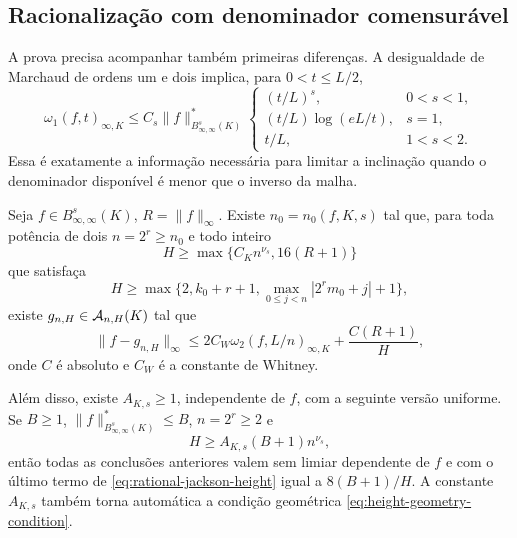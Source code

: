 \subsection{Racionalização com denominador comensurável}

A prova precisa acompanhar também primeiras diferenças. A desigualdade de
Marchaud de ordens um e dois
\citep{devorelorentz1993,lorentz1996} implica, para $0<t\le L/2$,
\begin{equation}
 \omega_1(f,t)_{\infty,K}
 \le C_s\|f\|_{B^s_{\infty,\infty}(K)}^*
 \begin{cases}
  (t/L)^s,&0<s<1,\\
  (t/L)\log(eL/t),&s=1,\\
  t/L,&1<s<2.
 \end{cases}
 \label{eq:marchaud-regimes}
\end{equation}
Essa é exatamente a informação necessária para limitar a inclinação quando
o denominador disponível é menor que o inverso da malha.

\begin{lemma}
\label{lem:rational-jackson-height}
Seja $f\in B^s_{\infty,\infty}(K)$, $R=\|f\|_\infty$. Existe
$n_0=n_0(f,K,s)$ tal que, para toda potência de dois $n=2^r\ge n_0$ e todo
inteiro
\[
 H\ge\max\{C_Kn^{\nu_s},16(R+1)\}
\]
que satisfaça
\begin{equation}
 H\ge\max\{2,k_0+r+1,
      \max_{0\le j<n}|2^rm_0+j|+1\},
 \label{eq:height-geometry-condition}
\end{equation}
existe $g_{n,H}\in\mathcal{A}_{n,H}(K)$ tal que
\begin{equation}
 \|f-g_{n,H}\|_\infty
 \le 2C_W\omega_2(f,L/n)_{\infty,K}
      +\frac{C(R+1)}{H},
 \label{eq:rational-jackson-height}
\end{equation}
onde $C$ é absoluto e $C_W$ é a constante de Whitney.

Além disso, existe $A_{K,s}\ge1$, independente de $f$, com a seguinte versão
uniforme. Se $B\ge1$, $\|f\|_{B^s_{\infty,\infty}(K)}^*\le B$, $n=2^r\ge2$
e
\begin{equation}
 H\ge A_{K,s}(B+1)n^{\nu_s},
 \label{eq:uniform-ball-height-threshold}
\end{equation}
então todas as conclusões anteriores valem sem limiar dependente de $f$ e com
o último termo de \eqref{eq:rational-jackson-height} igual a
$8(B+1)/H$. A constante $A_{K,s}$ também torna automática a condição
geométrica \eqref{eq:height-geometry-condition}.
\end{lemma}

